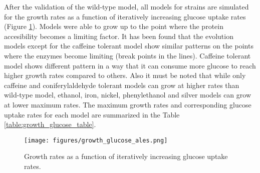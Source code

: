 After the validation of the wild-type model, all models for strains are simulated for the growth rates as a function of iteratively increasing glucose uptake rates (Figure \ref{fig:growth_glucose_ales}). Models were able to grow up to the point where the protein accesibility becomes a limiting factor. It has been found that the evolution models except for the caffeine tolerant model show similar patterns on the points where the enzymes become limiting (break points in the lines). Caffeine tolerant model shows different pattern in a way that it can consume more glucose to reach higher growth rates compared to others. Also it must be noted that while only caffeine and coniferylaldehyde tolerant models can grow at higher rates than wild-type model, ethanol, iron, nickel, phenylethanol and silver models can grow at lower maximum rates. The maximum growth rates and corresponding glucose uptake rates for each model are summarized in the Table \ref{table:growth_glucose_table}.

\begin{figure}[H]
  \begin{center}
  \texttt{[image: figures/growth\_glucose\_ales.png]}
  \caption[Growth rates as a function of iteratively increasing glucose uptake rates]{Growth rates as a function of iteratively increasing glucose uptake rates.}
  \label{fig:growth_glucose_ales}
  \end{center}
  \end{figure}
\vspace{-1.0cm}



